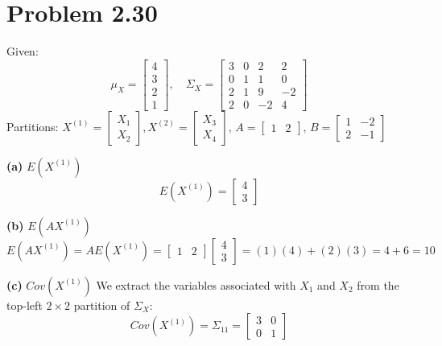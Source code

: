 \documentclass{article}
\begin{document}
\hrulefill

\section*{Problem 2.30}
Given:
\[
\mu_X = \begin{bmatrix} 4 \\ 3 \\ 2 \\ 1 \end{bmatrix}, \quad
\Sigma_X = \begin{bmatrix} 3 & 0 & 2 & 2 \\ 0 & 1 & 1 & 0 \\ 2 & 1 & 9 & -2 \\ 2 & 0 & -2 & 4 \end{bmatrix}
\]
Partitions: $X^{(1)} = \begin{bmatrix} X_1 \\ X_2 \end{bmatrix}, X^{(2)} = \begin{bmatrix} X_3 \\ X_4 \end{bmatrix}$, $A = \begin{bmatrix} 1 & 2 \end{bmatrix}$, $B = \begin{bmatrix} 1 & -2 \\ 2 & -1 \end{bmatrix}$

\noindent \textbf{(a)} $E(X^{(1)})$
\[
E(X^{(1)}) = \begin{bmatrix} 4 \\ 3 \end{bmatrix}
\]

\noindent \textbf{(b)} $E(AX^{(1)})$
\[
E(AX^{(1)}) = A E(X^{(1)}) = \begin{bmatrix} 1 & 2 \end{bmatrix} \begin{bmatrix} 4 \\ 3 \end{bmatrix} = (1)(4) + (2)(3) = 4 + 6 = 10
\]

\noindent \textbf{(c)} $Cov(X^{(1)})$ 
We extract the variables associated with $X_1$ and $X_2$ from the top-left $2 \times 2$ partition of $\Sigma_X$:
\[
Cov(X^{(1)}) = \Sigma_{11} = \begin{bmatrix} 3 & 0 \\ 0 & 1 \end{bmatrix}
\]
\end{document}
